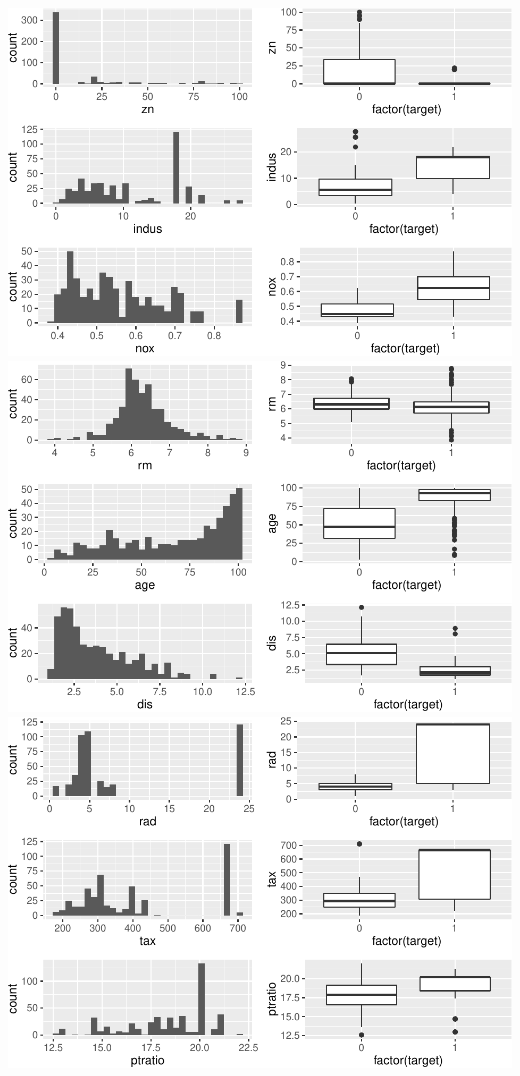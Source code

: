 \documentclass[]{article}
\begin{document}
\includegraphics{HW3_Final_files/figure-latex/unnamed-chunk-2-1.pdf}
\includegraphics{HW3_Final_files/figure-latex/unnamed-chunk-2-2.pdf}
\includegraphics{HW3_Final_files/figure-latex/unnamed-chunk-2-3.pdf}
\end{document}
